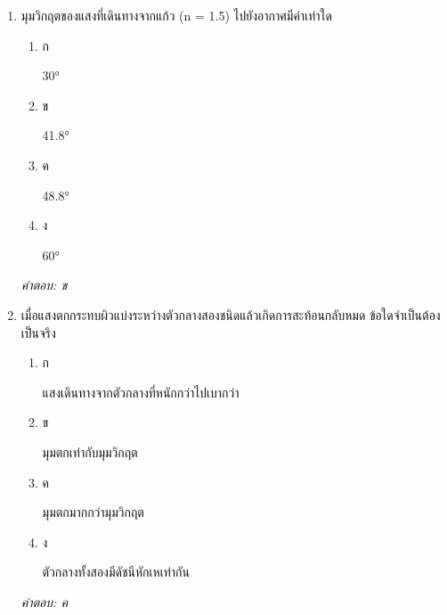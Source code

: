 \documentclass[12pt]{article}
\begin{document}
\begin{enumerate}[label=\arabic*., itemsep=0.5\baselineskip, topsep=0.5\baselineskip, leftmargin=*]
\item มุมวิกฤตของแสงที่เดินทางจากแก้ว (n = 1.5) ไปยังอากาศมีค่าเท่าใด
\begin{enumerate}[label=\alph*)., itemsep=0.3\baselineskip, topsep=0.3\baselineskip]
\item ก\ 
\begin{minipage}[t]{0.9\linewidth}
\raggedright 30°
\end{minipage}
\item ข\ 
\begin{minipage}[t]{0.9\linewidth}
\raggedright 41.8°
\end{minipage}
\item ค\ 
\begin{minipage}[t]{0.9\linewidth}
\raggedright 48.8°
\end{minipage}
\item ง\ 
\begin{minipage}[t]{0.9\linewidth}
\raggedright 60°
\end{minipage}
\end{enumerate}
\vspace{-0.3\baselineskip}
\begin{small}
\textit{คำตอบ: ข}
\end{small}

\item เมื่อแสงตกกระทบผิวแบ่งระหว่างตัวกลางสองชนิดแล้วเกิดการสะท้อนกลับหมด ข้อใดจำเป็นต้องเป็นจริง
\begin{enumerate}[label=\alph*)., itemsep=0.3\baselineskip, topsep=0.3\baselineskip]
\item ก\ 
\begin{minipage}[t]{0.9\linewidth}
\raggedright แสงเดินทางจากตัวกลางที่หนักกว่าไปเบากว่า
\end{minipage}
\item ข\ 
\begin{minipage}[t]{0.9\linewidth}
\raggedright มุมตกเท่ากับมุมวิกฤต
\end{minipage}
\item ค\ 
\begin{minipage}[t]{0.9\linewidth}
\raggedright มุมตกมากกว่ามุมวิกฤต
\end{minipage}
\item ง\ 
\begin{minipage}[t]{0.9\linewidth}
\raggedright ตัวกลางทั้งสองมีดัชนีหักเหเท่ากัน
\end{minipage}
\end{enumerate}
\vspace{-0.3\baselineskip}
\begin{small}
\textit{คำตอบ: ค}
\end{small}


\end{enumerate}
\end{document}
